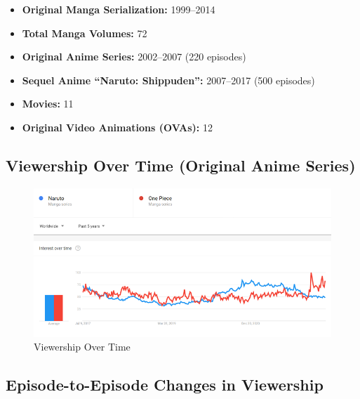 \documentclass[
  letterpaper,
  DIV=11,
  numbers=noendperiod]{scrartcl}
\providecommand{\tightlist}{%
  \setlength{\itemsep}{0pt}\setlength{\parskip}{0pt}}\usepackage{longtable,booktabs,array}
\begin{document}
\begin{itemize}
\tightlist
\item
  \textbf{Original Manga Serialization:} 1999--2014
\item
  \textbf{Total Manga Volumes:} 72
\item
  \textbf{Original Anime Series:} 2002--2007 (220 episodes)
\item
  \textbf{Sequel Anime ``Naruto: Shippuden'':} 2007--2017 (500 episodes)
\item
  \textbf{Movies:} 11
\item
  \textbf{Original Video Animations (OVAs):} 12
\end{itemize}

\hypertarget{viewership-over-time-original-anime-series}{%
\subsection{Viewership Over Time (Original Anime
Series)}\label{viewership-over-time-original-anime-series}}

\begin{figure}

{\centering \includegraphics{quarto2_files/mediabag/naruto-vs-one-piece-.png}

}

\caption{Viewership Over Time}

\end{figure}

\hypertarget{episode-to-episode-changes-in-viewership}{%
\subsection{Episode-to-Episode Changes in
Viewership}\label{episode-to-episode-changes-in-viewership}}
\end{document}
